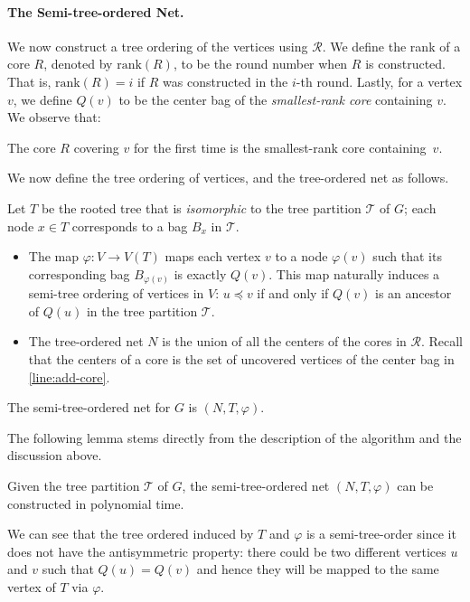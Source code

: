 \documentclass{article}
\newcommand{\mt}{\mathcal{T}}
\newcommand{\rank}{\mathrm{rank}}
\def\coreSet{\mathcal{R}}
\def\core{R}
\begin{document}
\paragraph*{The Semi-tree-ordered Net.~} We now construct a tree ordering of the vertices using $\coreSet$.   We define the rank of a core $\core$, denoted by $\rank(\core)$, to be the round number when $\core$ is constructed. That is, $\rank(\core) =i$ if $\core$ was constructed in the $i$-th round.  Lastly, for a vertex $v$, we define $Q(v)$ to be the center bag of the \emph{smallest-rank core} containing $v$. We observe that:
\begin{observation}\label{obs:smallest-rank}
	The core $R$ covering $v$ for the first time is the smallest-rank core containing~$v$.
\end{observation}
We now define the tree ordering of vertices, and the tree-ordered net as follows. 

\begin{definition}\label{def:vertexOrdering}
Let $T$ be the rooted tree that is \emph{isomorphic} to the tree partition $\mathcal{T}$ of $G$; each node $x\in T$ corresponds to a bag $B_x$ in $\mathcal{T}$. 
        \begin{itemize}
		\item  The map $\varphi: V\rightarrow V(T)$ maps each vertex $v$ to a node $\varphi(v)$ such that its corresponding bag $B_{\varphi(v)}$ is exactly $Q(v)$. This map naturally induces a semi-tree ordering of vertices in $V$:   $u \preceq v$ if and only if $Q(v)$ is an ancestor of $Q(u)$ in the tree partition $\mathcal{T}$.
		\item  The tree-ordered net $N$ is the union of all the centers of the cores in $\coreSet$. Recall that the centers of a core is the set of uncovered vertices of the center bag in \cref{line:add-core}. 
	\end{itemize}
	The semi-tree-ordered net for $G$ is $(N, T, \varphi)$. 
\end{definition}

 The following lemma stems directly from the description of the algorithm and the discussion above.


\begin{lemma}
	\label{lem:vertexIsInCore}
	Given the tree partition $\mt$ of $G$, the semi-tree-ordered net $(N,T,\varphi)$ can be constructed in polynomial time.
\end{lemma}

We can see that the tree ordered induced by $T$ and  $\varphi$ is a semi-tree-order since it does not have the antisymmetric property: there could be two different vertices $u$ and $v$ such that $Q(u) = Q(v)$ and hence they will be mapped to the same vertex of $T$ via $\varphi$.  
\end{document}
